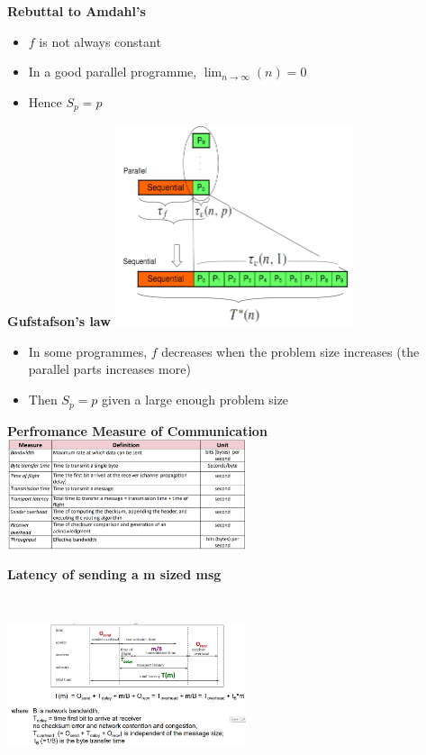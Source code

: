 \documentclass[10pt, landscape]{article}
\begin{document}
\begin{multicols}{4}
\textbf{Rebuttal to Amdahl's}
\begin{itemize}
    \item $f$ is not always constant 
    \item In a good parallel programme, $\lim_{n\rightarrow \infty}(n)=0$
    \item Hence $S_{p}=p$
\end{itemize}

\textbf{Gufstafson's law}
\includegraphics*[width=7cm]{guslaw.png}
\begin{itemize}
    \item In some programmes, $f$ decreases when the problem size increases (the parallel parts increases more)
    \item Then $S_p=p$ given a large enough problem size
\end{itemize}

\textbf{Perfromance Measure of Communication}
\includegraphics*[width=7cm]{communication.png}


\textbf{Latency of sending a m sized msg}
\includegraphics*[width=7cm, height=6cm]{latency.png}


\end{multicols}
\end{document}
